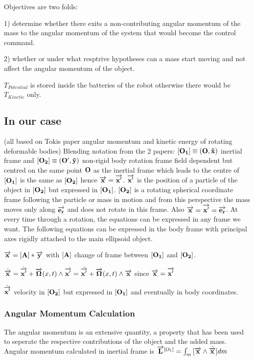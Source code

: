 Objectives are two folds:

1) determine whether there exits a non-contributing angular momentum of the mass to the angular momentum of the system that would become the control command.

2) whether or under what resptrive hypotheses can a mass start moving and not affect the angular momentum of the object.

$T_{Potential}$ is stored inside the batteries of the robot otherwise there would be $T_{Kinetic}$ only.

\subsection{In our case}
(all based on Tokis paper angular momentum and kinetic energy of rotating deformable bodies)
Blending notation from the 2 papers:
$\bf [O_1]\equiv(O, \vec{x})$ inertial frame and $[\bf O_2]\equiv(O', \vec{y})$ non-rigid body rotation frame field dependent but centred on the same point $\bf O$ as the inertial frame which leads to the centre of $\bf [O_1]$ is the same as $\bf [O_2]$ hence $\overrightarrow{\bf x}=\overrightarrow{\bf x'}$. $\overrightarrow{\bf x'}$ is the position of a particle of the object in $[\bf O_2]$ but expressed in $[\bf O_1]$. $[\bf O_2]$ is a rotating spherical coordinate frame following the particle or mass in motion and from this perspective the mass moves only along $\overrightarrow{\bf e_r}$ and does not rotate in this frame. Also $\overrightarrow{\bf x}=\overrightarrow{\bf x'}=\overrightarrow{\bf e_r}$. At every time through a rotation, the equations can be expressed in any frame we want. The following equations can be expressed in the body frame with principal axes rigidly attached to the main ellipsoid object.

$\overrightarrow{\bf x}=[\bf A]*\overrightarrow{\bf y}$ with $[\bf A]$ change of frame between $[\bf O_1]$ and $[\bf O_2]$. 

$\dot{\overrightarrow{\bf x}}=\dot{\overrightarrow{\bf x'}}+\overrightarrow{\bf \Omega}(x,t)\wedge\overrightarrow{\bf x'}=\dot{\overrightarrow{\bf x'}}+\overrightarrow{\bf \Omega}(x,t)\wedge\overrightarrow{\bf x}$ since $\overrightarrow{\bf x}=\overrightarrow{\bf x'}$

$\dot{\overrightarrow{\bf x'}}$ velocity in $[\bf O_2]$ but expressed in $[\bf O_1]$ and eventually in body coordinates.
\subsubsection{Angular Momentum Calculation}
The angular momentum is an extensive quantity, a property that has been used to seperate the respective contributions of the object and the added mass.
Angular momentum calculated in inertial frame is 
$\overrightarrow{\bf L}^{[O_1]}=\int_{m}{[\overrightarrow{\bf x}\wedge\dot{\overrightarrow{\bf x}}]}dm$

